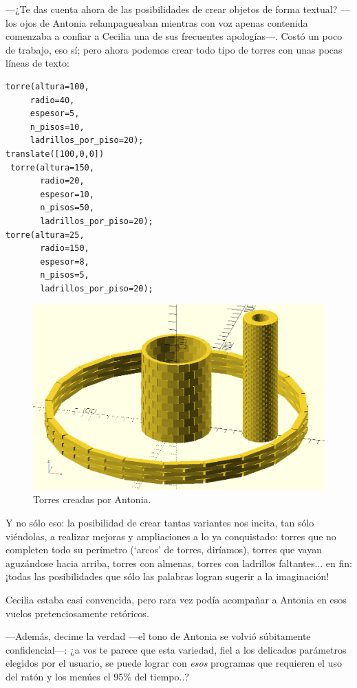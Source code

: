 ---¿Te das cuenta ahora de las posibilidades de crear objetos de forma
textual? ---los ojos de Antonia relampagueaban mientras con voz apenas
contenida comenzaba a confiar a Cecilia una de sus frecuentes
apologías---. Costó un poco de trabajo, eso sí; pero ahora podemos
crear todo tipo de torres con unas pocas líneas de texto:

    \begin{lstlisting}
torre(altura=100,
     radio=40,
     espesor=5,
     n_pisos=10,
     ladrillos_por_piso=20);
translate([100,0,0])
 torre(altura=150,
       radio=20,
       espesor=10,
       n_pisos=50,
       ladrillos_por_piso=20);
torre(altura=25,
       radio=150,
       espesor=8,
       n_pisos=5,
       ladrillos_por_piso=20);
\end{lstlisting}  



\begin{figure}[ht]
  \centering
  \includegraphics[width=.85\textwidth]{imagenes/torres}  
  \caption{Torres creadas por Antonia.}
  \label{fig:torres}
\end{figure}


\guillemotright Y no sólo eso: la posibilidad de crear tantas
variantes nos incita, tan sólo viéndolas, a realizar mejoras y
ampliaciones a lo ya conquistado: torres que no completen todo su
perímetro (`arcos' de torres, diríamos), torres que vayan aguzándose
hacia arriba, torres con almenas, torres con ladrillos faltantes... en
fin: ¡todas las posibilidades que sólo las palabras logran sugerir a
la imaginación!

Cecilia estaba casi convencida, pero rara vez podía acompañar a
Antonia en esos vuelos pretenciosamente retóricos.

---Además, decime la verdad ---el tono de Antonia se volvió
súbitamente confidencial---: ¿a vos te parece que esta variedad, fiel
a los delicados parámetros elegidos por el usuario, se puede lograr
con \emph{esos} programas que requieren el uso del ratón y los menúes
el 95\% del tiempo..?

